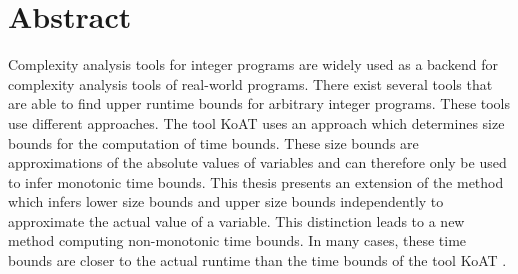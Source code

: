 \chapter*{Abstract}

Complexity analysis tools for integer programs are widely used as a backend for complexity analysis tools of real-world programs.
There exist several tools that are able to find upper runtime bounds for arbitrary integer programs.
These tools use different approaches.
The tool KoAT \cite{koat} uses an approach which determines size bounds for the computation of time bounds.
These size bounds are approximations of the absolute values of variables and can therefore only be used to infer monotonic time bounds.
This thesis presents an extension of the method which infers lower size bounds and upper size bounds independently to approximate the actual value of a variable.
This distinction leads to a new method computing non-monotonic time bounds.
In many cases, these time bounds are closer to the actual runtime than the time bounds of the tool KoAT \cite{koat}.
